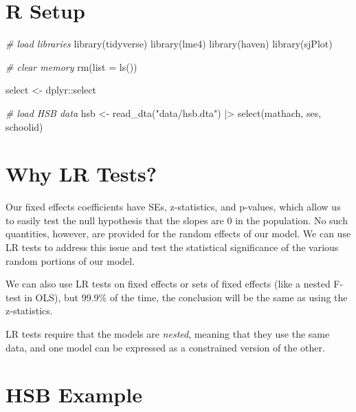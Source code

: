 \documentclass[
  letterpaper,
  DIV=11,
  numbers=noendperiod]{scrreprt}
\newenvironment{Shaded}{\begin{snugshade}}{\end{snugshade}}
\newcommand{\AttributeTok}[1]{\textcolor[rgb]{0.49,0.56,0.16}{#1}}
\newcommand{\CommentTok}[1]{\textcolor[rgb]{0.38,0.63,0.69}{\textit{#1}}}
\newcommand{\FunctionTok}[1]{\textcolor[rgb]{0.02,0.16,0.49}{#1}}
\newcommand{\NormalTok}[1]{\textcolor[rgb]{0.00,0.44,0.13}{#1}}
\newcommand{\OtherTok}[1]{\textcolor[rgb]{0.00,0.44,0.13}{#1}}
\newcommand{\SpecialCharTok}[1]{\textcolor[rgb]{0.25,0.44,0.63}{#1}}
\newcommand{\StringTok}[1]{\textcolor[rgb]{0.25,0.44,0.63}{#1}}
\begin{document}
\hypertarget{r-setup-1}{%
\section{R Setup}\label{r-setup-1}}

\begin{Shaded}
\begin{Highlighting}[]
\CommentTok{\# load libraries}
\FunctionTok{library}\NormalTok{(tidyverse)}
\FunctionTok{library}\NormalTok{(lme4)}
\FunctionTok{library}\NormalTok{(haven)}
\FunctionTok{library}\NormalTok{(sjPlot)}

\CommentTok{\# clear memory}
\FunctionTok{rm}\NormalTok{(}\AttributeTok{list =} \FunctionTok{ls}\NormalTok{())}

\NormalTok{select }\OtherTok{\textless{}{-}}\NormalTok{ dplyr}\SpecialCharTok{::}\NormalTok{select}

\CommentTok{\# load HSB data}
\NormalTok{hsb }\OtherTok{\textless{}{-}} \FunctionTok{read\_dta}\NormalTok{(}\StringTok{"data/hsb.dta"}\NormalTok{) }\SpecialCharTok{|\textgreater{}} 
  \FunctionTok{select}\NormalTok{(mathach, ses, schoolid)}
\end{Highlighting}
\end{Shaded}

\hypertarget{why-lr-tests}{%
\section{Why LR Tests?}\label{why-lr-tests}}

Our fixed effects coefficients have SEs, z-statistics, and p-values,
which allow us to easily test the null hypothesis that the slopes are 0
in the population. No such quantities, however, are provided for the
random effects of our model. We can use LR tests to address this issue
and test the statistical significance of the various random portions of
our model.

We can also use LR tests on fixed effects or sets of fixed effects (like
a nested F-test in OLS), but 99.9\% of the time, the conclusion will be
the same as using the z-statistics.

LR tests require that the models are \emph{nested}, meaning that they
use the same data, and one model can be expressed as a constrained
version of the other.

\hypertarget{hsb-example}{%
\section{HSB Example}\label{hsb-example}}
\end{document}
